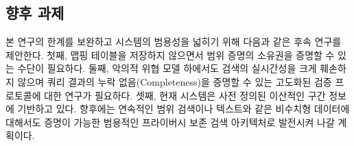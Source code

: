 \subsection{향후 과제}
본 연구의 한계를 보완하고 시스템의 범용성을 넓히기 위해 다음과 같은 후속 연구를 제안한다. 첫째, 맵핑 테이블을 저장하지 않으면서 범위 증명의 소유권을 증명할 수 있는 수단이 필요하다. 둘째, 악의적 위협 모델 하에서도 검색의 실시간성을 크게 훼손하지 않으며 쿼리 결과의 누락 없음(Completeness)을 증명할 수 있는 고도화된 검증 프로토콜에 대한 연구가 필요하다. 셋째, 현재 시스템은 사전 정의된 이산적인 구간 정보에 기반하고 있다. 향후에는 연속적인 범위 검색이나 텍스트와 같은 비수치형 데이터에 대해서도 증명이 가능한 범용적인 프라이버시 보존 검색 아키텍처로 발전시켜 나갈 계획이다.